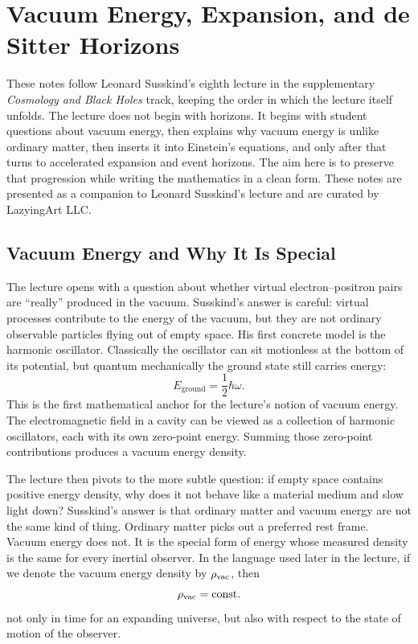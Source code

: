 \chapter{Vacuum Energy, Expansion, and de Sitter Horizons}

These notes follow Leonard Susskind's eighth lecture in the supplementary \emph{Cosmology and Black Holes} track, keeping the order in which the lecture itself unfolds. The lecture does not begin with horizons. It begins with student questions about vacuum energy, then explains why vacuum energy is unlike ordinary matter, then inserts it into Einstein's equations, and only after that turns to accelerated expansion and event horizons. The aim here is to preserve that progression while writing the mathematics in a clean form. These notes are presented as a companion to Leonard Susskind's lecture and are curated by LazyingArt LLC.

\section{Vacuum Energy and Why It Is Special}

The lecture opens with a question about whether virtual electron--positron pairs are ``really'' produced in the vacuum. Susskind's answer is careful: virtual processes contribute to the energy of the vacuum, but they are not ordinary observable particles flying out of empty space. His first concrete model is the harmonic oscillator. Classically the oscillator can sit motionless at the bottom of its potential, but quantum mechanically the ground state still carries energy:
\begin{equation}
E_{\text{ground}}=\frac{1}{2}\hbar\omega.
\end{equation}
This is the first mathematical anchor for the lecture's notion of vacuum energy. The electromagnetic field in a cavity can be viewed as a collection of harmonic oscillators, each with its own zero-point energy. Summing those zero-point contributions produces a vacuum energy density.

The lecture then pivots to the more subtle question: if empty space contains positive energy density, why does it not behave like a material medium and slow light down? Susskind's answer is that ordinary matter and vacuum energy are not the same kind of thing. Ordinary matter picks out a preferred rest frame. Vacuum energy does not. It is the special form of energy whose measured density is the same for every inertial observer. In the language used later in the lecture, if we denote the vacuum energy density by \(\rho_{\rm vac}\), then
\begin{equation}
\rho_{\rm vac}=\text{const.}
\end{equation}
not only in time for an expanding universe, but also with respect to the state of motion of the observer.

